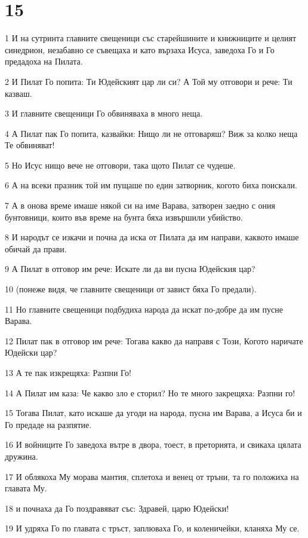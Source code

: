 \chapter{15}

\par 1 И на сутринта главните свещеници със старейшините и книжниците и целият синедрион, незабавно се съвещаха и като вързаха Исуса, заведоха Го и Го предадоха на Пилата.
\par 2 И Пилат Го попита: Ти Юдейският цар ли си? А Той му отговори и рече: Ти казваш.
\par 3 И главните свещеници Го обвиняваха в много неща.
\par 4 А Пилат пак Го попита, казвайки: Нищо ли не отговаряш? Виж за колко неща Те обвиняват!
\par 5 Но Исус нищо вече не отговори, така щото Пилат се чудеше.
\par 6 А на всеки празник той им пущаше по един затворник, когото биха поискали.
\par 7 А в онова време имаше някой си на име Варава, затворен заедно с ония бунтовници, които във време на бунта бяха извършили убийство.
\par 8 И народът се изкачи и почна да иска от Пилата да им направи, каквото имаше обичай да прави.
\par 9 А Пилат в отговор им рече: Искате ли да ви пусна Юдейския цар?
\par 10 (понеже видя, че главните свещеници от завист бяха Го предали).
\par 11 Но главните свещеници подбудиха народа да искат по-добре да им пусне Варава.
\par 12 Пилат пак в отговор им рече: Тогава какво да направя с Този, Когото наричате Юдейски цар?
\par 13 А те пак изкрещяха: Разпни Го!
\par 14 А Пилат им каза: Че какво зло е сторил? Но те много закрещяха: Разпни го!
\par 15 Тогава Пилат, като искаше да угоди на народа, пусна им Варава, а Исуса би и Го предаде на разпятие.
\par 16 И войниците Го заведоха вътре в двора, тоест, в преторията, и свикаха цялата дружина.
\par 17 И облякоха Му морава мантия, сплетоха и венец от тръни, та го положиха на главата Му.
\par 18 и почнаха да Го поздравяват със: Здравей, царю Юдейски!
\par 19 И удряха Го по главата с тръст, заплюваха Го, и коленичейки, кланяха Му се.
